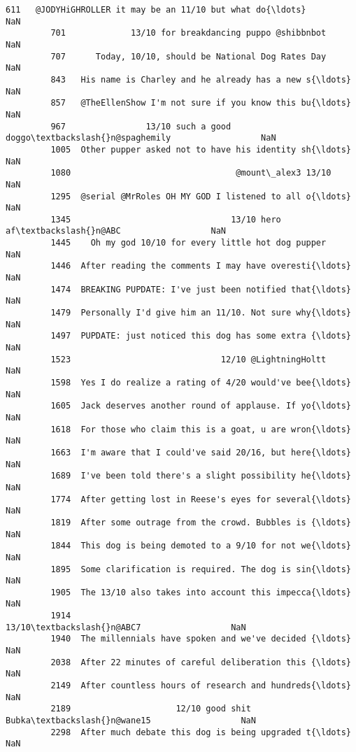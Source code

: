 \documentclass[11pt]{article}
\begin{document}
\begin{Verbatim}[commandchars=\\\{\}]
         611   @JODYHiGHROLLER it may be an 11/10 but what do{\ldots}                  NaN   
         701             13/10 for breakdancing puppo @shibbnbot                  NaN   
         707      Today, 10/10, should be National Dog Rates Day                  NaN   
         843   His name is Charley and he already has a new s{\ldots}                  NaN   
         857   @TheEllenShow I'm not sure if you know this bu{\ldots}                  NaN   
         967                13/10 such a good doggo\textbackslash{}n@spaghemily                  NaN   
         1005  Other pupper asked not to have his identity sh{\ldots}                  NaN   
         1080                                 @mount\_alex3 13/10                  NaN   
         1295  @serial @MrRoles OH MY GOD I listened to all o{\ldots}                  NaN   
         1345                                13/10 hero af\textbackslash{}n@ABC                  NaN   
         1445    Oh my god 10/10 for every little hot dog pupper                  NaN   
         1446  After reading the comments I may have overesti{\ldots}                  NaN   
         1474  BREAKING PUPDATE: I've just been notified that{\ldots}                  NaN   
         1479  Personally I'd give him an 11/10. Not sure why{\ldots}                  NaN   
         1497  PUPDATE: just noticed this dog has some extra {\ldots}                  NaN   
         1523                              12/10 @LightningHoltt                  NaN   
         1598  Yes I do realize a rating of 4/20 would've bee{\ldots}                  NaN   
         1605  Jack deserves another round of applause. If yo{\ldots}                  NaN   
         1618  For those who claim this is a goat, u are wron{\ldots}                  NaN   
         1663  I'm aware that I could've said 20/16, but here{\ldots}                  NaN   
         1689  I've been told there's a slight possibility he{\ldots}                  NaN   
         1774  After getting lost in Reese's eyes for several{\ldots}                  NaN   
         1819  After some outrage from the crowd. Bubbles is {\ldots}                  NaN   
         1844  This dog is being demoted to a 9/10 for not we{\ldots}                  NaN   
         1895  Some clarification is required. The dog is sin{\ldots}                  NaN   
         1905  The 13/10 also takes into account this impecca{\ldots}                  NaN   
         1914                                       13/10\textbackslash{}n@ABC7                  NaN   
         1940  The millennials have spoken and we've decided {\ldots}                  NaN   
         2038  After 22 minutes of careful deliberation this {\ldots}                  NaN   
         2149  After countless hours of research and hundreds{\ldots}                  NaN   
         2189                     12/10 good shit Bubka\textbackslash{}n@wane15                  NaN   
         2298  After much debate this dog is being upgraded t{\ldots}                  NaN   
         

\end{Verbatim}
\end{document}
